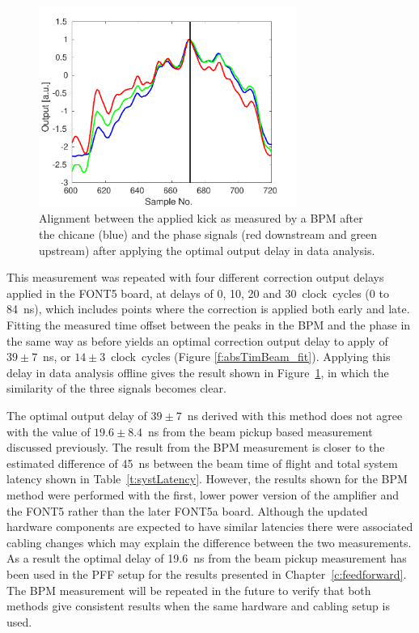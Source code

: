 \begin{figure}
  \centering
  \includegraphics[width=0.75\textwidth]{Figures/commissioning/absTimBeam_opt}
  \caption{Alignment between the applied kick as measured by a BPM after the chicane (blue) and the phase signals (red downstream and green upstream) after applying the optimal output delay in data analysis.}
  \label{f:absTimBeam_opt}
\end{figure}

This measurement was repeated with four different correction output delays applied in the FONT5 board, at delays of 0, 10, 20 and 30~clock~cycles (0 to 84~ns), which includes points where the correction is applied both early and late. Fitting the measured time offset between the peaks in the BPM and the phase in the same way as before yields an optimal correction output delay to apply of \(39\pm7\)~ns, or \(14\pm3\)~clock~cycles (Figure \ref{f:absTimBeam_fit}). Applying this delay in data analysis offline gives the result shown in Figure~\ref{f:absTimBeam_opt}, in which the similarity of the three signals becomes clear.

The optimal output delay of \(39\pm7\)~ns derived with this method does not agree with the value of \(19.6\pm8.4\)~ns from the beam pickup based measurement discussed previously.
The result from the BPM measurement is closer to the estimated difference of 45~ns between the beam time of flight and total system latency shown in Table~\ref{t:systLatency}. However, the results shown for the BPM method were performed with the first, lower power version of the amplifier and the FONT5 rather than the later FONT5a board. 
Although the updated hardware components are expected to have similar latencies there were associated cabling changes which may explain the difference between the two measurements. 
As a result the optimal delay of 19.6~ns from the beam pickup measurement has been used in the PFF setup for the results presented in Chapter~\ref{c:feedforward}.
The BPM measurement will be repeated in the future to verify that both methods give consistent results when the same hardware and cabling setup is used.

